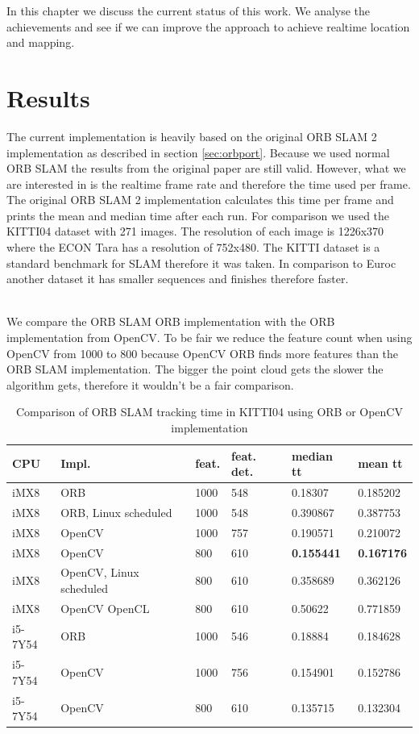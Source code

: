\documentclass[11pt,a4paper,titlepage,oneside]{report}
\begin{document}
In this chapter we discuss the current status of this work. We analyse the achievements and see if we can improve the approach to achieve realtime location and mapping.

\section{Results}\label{sec:results}

The current implementation is heavily based on the original ORB SLAM 2 implementation as described in section \ref{sec:orbport}. Because we used normal ORB SLAM the results from the original paper are still valid. However, what we are interested in is the realtime frame rate and therefore the time used per frame. The original ORB SLAM 2 implementation calculates this time per frame and prints the mean and median time after each run. For comparison we used the KITTI04 dataset with 271 images. The resolution of each image is 1226x370 where the ECON Tara has a resolution of 752x480. The KITTI dataset is a standard benchmark for SLAM therefore it was taken. In comparison to Euroc another dataset it has smaller sequences and finishes therefore faster.\\\

We compare the ORB SLAM ORB implementation with the ORB implementation from OpenCV. To be fair we reduce the feature count when using OpenCV from 1000 to 800 because OpenCV ORB finds more features than the ORB SLAM implementation. The bigger the point cloud gets the slower the algorithm gets, therefore it wouldn't be a fair comparison.

\begin{table}
	\begin{tabular}{  | l | l | l | l | l | l | }
		\hline
		\textbf{CPU} & \textbf{Impl.} & \textbf{feat.} & \textbf{feat. det.} & \textbf{median tt} & \textbf{mean tt} \\ \hline
		iMX8 & ORB & 1000 &  548 & 0.18307 & 0.185202 \\ \hline
		iMX8 & ORB, Linux scheduled & 1000 & 548 & 0.390867 & 0.387753 \\ \hline
		iMX8 & OpenCV & 1000 & 757 & 0.190571 & 0.210072 \\ \hline
		iMX8 & OpenCV & 800 & 610 & \textbf{0.155441} & \textbf{0.167176} \\ \hline
		iMX8 & OpenCV, Linux scheduled & 800 & 610 & 0.358689 & 0.362126 \\ \hline
		iMX8 & OpenCV OpenCL & 800 & 610 & 0.50622 & 0.771859 \\ \hline
		i5-7Y54 & ORB & 1000 & 546 & 0.18884 & 0.184628 \\ \hline
		i5-7Y54 & OpenCV & 1000 & 756 & 0.154901 & 0.152786 \\ \hline
		i5-7Y54 & OpenCV & 800 & 610 & 0.135715 & 0.132304 \\ \hline
	\end{tabular}
	\caption{Comparison of ORB SLAM tracking time in KITTI04 using ORB or OpenCV implementation}
  \label{tab:result}
\end{table}
\end{document}
